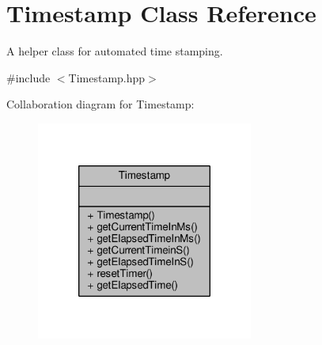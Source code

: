 \hypertarget{classTimestamp}{\section{Timestamp Class Reference}
\label{classTimestamp}
}


A helper class for automated time stamping.  




{\ttfamily \#include $<$Timestamp.\-hpp$>$}



Collaboration diagram for Timestamp\-:
\nopagebreak
\begin{figure}[H]
\begin{center}
\leavevmode
\includegraphics[width=202pt]{classTimestamp__coll__graph}
\end{center}
\end{figure}

